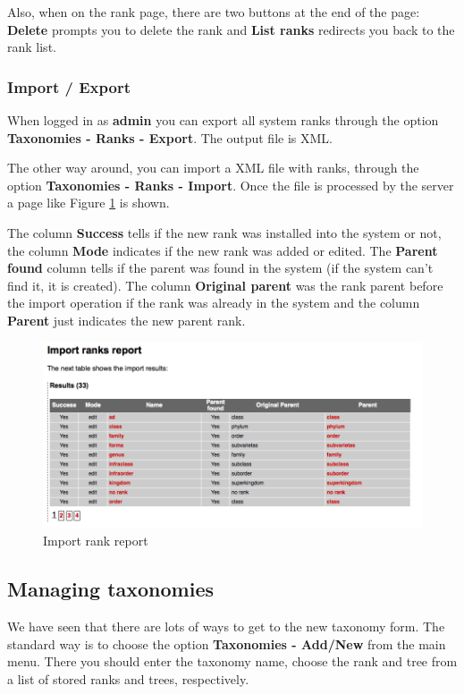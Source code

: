 Also, when on the rank page, there are two buttons at the end of the page: \textbf{Delete} prompts you to
delete the rank and \textbf{List ranks} redirects you back to the rank list.

\subsubsection{Import / Export}

When logged in as \textbf{admin} you can export all system ranks through the option
\textbf{Taxonomies - Ranks - Export}. The output file is XML.

The other way around, you can import a XML file with ranks, through the option
\textbf{Taxonomies - Ranks - Import}. Once the file is processed by the server
a page like Figure \ref{fig:rank_import} is shown.

The column \textbf{Success} tells if the new rank was installed into the system or not,
the column \textbf{Mode} indicates if the new rank was added or edited. The \textbf{Parent found}
column tells if the parent was found in the system (if the system can't find it, it is created).
The column \textbf{Original parent} was the rank parent before the import operation if the rank
was already in the system and the column \textbf{Parent} just indicates the new parent rank.

\begin{figure}[H]
  \centering
    \includegraphics[scale=0.4]{rank_import.png}
  \caption{Import rank report}
  \label{fig:rank_import}
\end{figure}

\subsection{Managing taxonomies}

We have seen that there are lots of ways to get to the new taxonomy form. The standard way is to
choose the option \textbf{Taxonomies - Add/New} from the main menu. There you should enter the
taxonomy name, choose the rank and tree from a list of stored ranks and trees, respectively.


